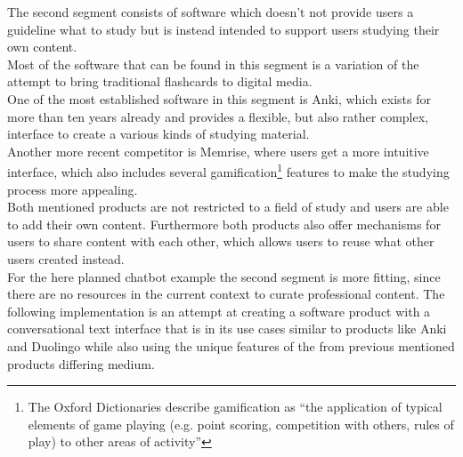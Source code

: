 The second segment consists of software which doesn't not provide users a guideline what to study but is instead intended to support users studying their own content.
\\
Most of the software that can be found in this segment is a variation of the attempt to bring traditional flashcards to digital media.
\\
One of the most established software in this segment is Anki\cite{lifehacker}, which exists for more than ten years already and provides a flexible, but also rather complex, interface to create a various kinds of studying material.
\\
Another more recent competitor is Memrise, where users get a more intuitive interface, which also includes several gamification\footnote{The Oxford Dictionaries describe gamification as ``the application of typical elements of game playing (e.g. point scoring, competition with others, rules of play) to other areas of activity''\cite{oxfordgamification}} features to make the studying process more appealing.
\\
Both mentioned products are not restricted to a field of study and users are able to add their own content. Furthermore both products also offer mechanisms for users to share content with each other, which allows users to reuse what other users created instead.
\\

For the here planned chatbot example the second segment is more fitting, since there are no resources in the current context to curate professional content.
The following implementation is an attempt at creating a software product with a conversational text interface that is in its use cases similar to products like Anki and Duolingo while also using the unique features of the from previous mentioned products differing medium.
